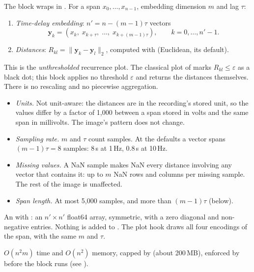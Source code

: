 The block wraps  in
. For a span $x_0,\dots,x_{n-1}$, embedding
dimension $m$ and lag $\tau$:
\begin{enumerate}
\item \emph{Time-delay embedding}: $n' = n - (m-1)\tau$ vectors
  \[ \mathbf y_k = (x_k,\; x_{k+\tau},\; \dots,\; x_{k+(m-1)\tau}), \qquad k = 0,\dots,n'-1. \]
\item \emph{Distances}: $R_{kl} = \lVert \mathbf y_k - \mathbf y_l \rVert_2$, computed with
   (Euclidean, its default).
\end{enumerate}
This is the \emph{unthresholded} recurrence plot. The classical plot of
\citet{eckmann1987recurrence} marks $R_{kl} \le \varepsilon$ as a black dot; this block
applies no threshold $\varepsilon$ and returns the distances themselves. There is no
rescaling and no piecewise aggregation.

\begin{itemize}
\item \emph{Units.} Not unit-aware: the distances are in the recording's stored unit, so the
  values differ by a factor of 1{,}000 between a span stored in volts and the same span in
  millivolts. The image's pattern does not change.
\item \emph{Sampling rate.} $m$ and $\tau$ count samples. At the defaults a vector spans
  $(m-1)\tau = 8$ samples: 8\,s at 1\,Hz, 0.8\,s at 10\,Hz.
\item \emph{Missing values.} A NaN sample makes NaN every distance involving any vector that
  contains it: up to $m$ NaN rows and columns per missing sample. The rest of the image is
  unaffected.
\item \emph{Span length.} At most 5{,}000 samples, and more than $(m-1)\tau$ (below).
\end{itemize}

An  with : an $n' \times n'$ float64 array, symmetric, with
a zero diagonal and non-negative entries. Nothing is added to . The plot hook
draws all four encodings of the span, with the same $m$ and $\tau$.

$O(n^2 m)$ time and $O(n^2)$ memory, capped by  (about
200\,MB), enforced by  before the block runs (see
).

